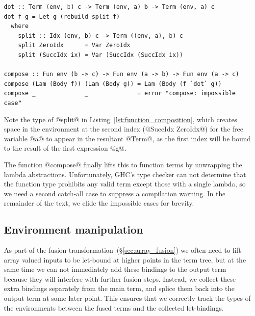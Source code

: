 \begin{lstlisting}[style=haskell_float
    ,label=lst:function_composition
    ,caption={A simultaneous substitution to compose unary function terms}]
dot :: Term (env, b) c -> Term (env, a) b -> Term (env, a) c
dot f g = Let g (rebuild split f)
  where
    split :: Idx (env, b) c -> Term ((env, a), b) c
    split ZeroIdx      = Var ZeroIdx
    split (SuccIdx ix) = Var (SuccIdx (SuccIdx ix))

compose :: Fun env (b -> c) -> Fun env (a -> b) -> Fun env (a -> c)
compose (Lam (Body f)) (Lam (Body g)) = Lam (Body (f `dot` g))
compose _              _              = error "compose: impossible case"
\end{lstlisting}

Note the type of @split@ in Listing~\ref{lst:function_composition}, which
creates space in the environment at the second index (@SuccIdx ZeroIdx@) for the
free variable @a@ to appear in the resultant @Term@, as the first index will be
bound to the result of the first expression @g@.

The function @compose@ finally lifts this to function terms by unwrapping the
lambda abstractions. Unfortunately, GHC's type checker can not determine that the
function type prohibits any valid term except those with a single lambda, so we
need a second catch-all case to suppress a compilation warning. In the remainder
of the text, we elide the impossible cases for brevity.


\subsection{Environment manipulation}
\label{sec:environment_manipulation}

As part of the fusion transformation~(\S\ref{sec:array_fusion}) we often need to
lift array valued inputs to be let-bound at higher points in the term tree, but
at the same time we can not immediately add these bindings to the output term
because they will interfere with further fusion steps. Instead, we collect these
extra bindings separately from the main term, and splice them back into the
output term at some later point. This ensures that we correctly track the types
of the environments between the fused terms and the collected let-bindings.

